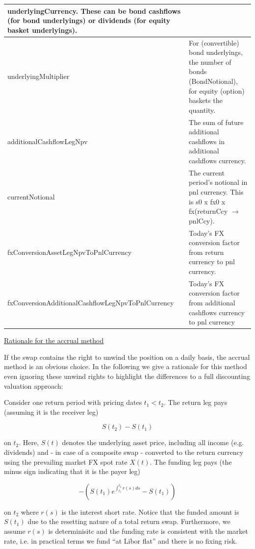 \begin{longtable}{|p{10cm}|p{6cm}|}
                        underlyingCurrency. These can be bond cashflows (for bond underlyings) or dividends (for equity
                        basket underlyings). \\
  \hline
  underlyingMultiplier & For (convertible) bond underlyings, the number of bonds (BondNotional), for equity (option)
                         baskets the quantity. \\
  \hline
  additionalCashflowLegNpv & The sum of future additional cashflows in additional cashflows currency. \\
  \hline
  currentNotional & The current period's notional in pnl currency. This is s0 x fx0 x fx(returnCcy $\rightarrow$ pnlCcy). \\
  \hline
  fxConversionAssetLegNpvToPnlCurrency & Today's FX conversion factor from return currency to pnl currency. \\
  \hline
  fxConversionAdditionalCashflowLegNpvToPnlCurrency & Today's FX conversion factor from additional cashflows currency to pnl currency \\
  \hline
\end{longtable}


\underline{Rationale for the accrual method}

If the swap contains the right to unwind the position on a daily basis, the accrual method is an obvious choice. In the
following we give a rationale for this method even ignoring these unwind rights to highlight the differences to a full
discounting valuation approach:

Consider one return period with pricing dates $t_1 < t_2$. The return leg pays (assuming it is the receiver leg)

\begin{equation}
  S(t_2) - S(t_1)
\end{equation}

on $t_2$. Here, $S(t)$ denotes the underlying asset price, including all income (e.g. dividends) and - in case of a
composite swap - converted to the return currency using the prevailing market FX spot rate $X(t)$. The funding leg pays
(the minus sign indicating that it is the payer leg)

\begin{equation}
  - \left( S(t_1) e^{\int_{t_1}^{t_2} r(s) ds} - S(t_1) \right)
\end{equation}

on $t_2$ where $r(s)$ is the interest short rate. Notice that the funded amount is $S(t_1)$ due to the resetting nature
of a total return swap. Furthermore, we assume $r(s)$ is determinisitc and the funding rate is consistent with the
market rate, i.e. in practical terms we fund ``at Libor flat'' and there is no fixing risk.

